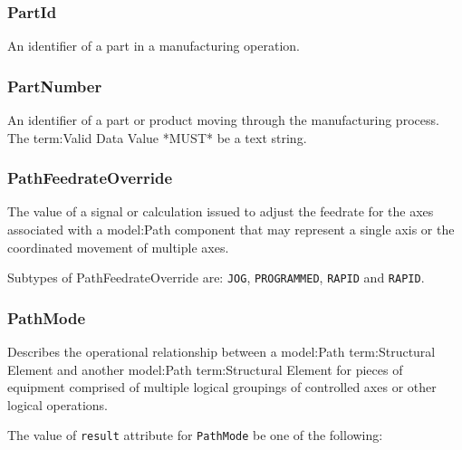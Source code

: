 \subsubsection{PartId}
  \label{sec:PartId}


An identifier of a part in a manufacturing operation.

\FloatBarrier

\subsubsection{PartNumber}
  \label{sec:PartNumber}


An identifier of a part or product moving through the manufacturing process. 
 The {term:Valid Data Value} *MUST* be a text string. 

\FloatBarrier

\subsubsection{PathFeedrateOverride}
  \label{sec:PathFeedrateOverride}


The value of a signal or calculation issued to adjust the feedrate for the axes associated with a {model:Path} component that may represent a single axis or the coordinated movement of multiple axes.


Subtypes of PathFeedrateOverride are: \texttt{JOG}, \texttt{PROGRAMMED}, \texttt{RAPID} and \texttt{RAPID}. 
\FloatBarrier

\subsubsection{PathMode}
  \label{sec:PathMode}


Describes the operational relationship between a {model:Path} {term:Structural Element} and another {model:Path} {term:Structural Element} for pieces of equipment comprised of multiple logical groupings of controlled axes or other logical operations.


The value of \texttt{result} attribute for \texttt{PathMode} \MUST be one of the following: 

